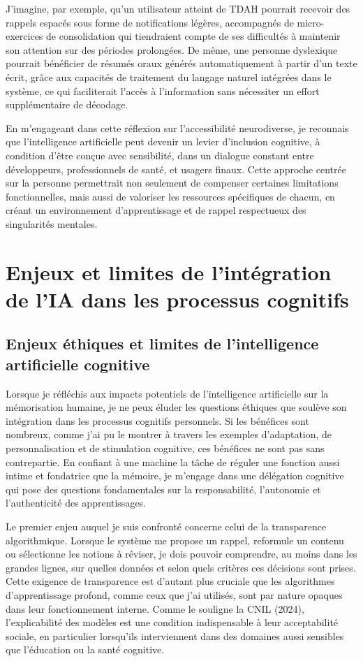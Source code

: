 \documentclass[11pt,a4paper]{report}
\begin{document}
J’imagine, par exemple, qu’un utilisateur atteint de TDAH pourrait recevoir des rappels espacés sous forme de notifications légères, accompagnés de micro-exercices de consolidation qui tiendraient compte de ses difficultés à maintenir son attention sur des périodes prolongées. De même, une personne dyslexique pourrait bénéficier de résumés oraux générés automatiquement à partir d’un texte écrit, grâce aux capacités de traitement du langage naturel intégrées dans le système, ce qui faciliterait l’accès à l’information sans nécessiter un effort supplémentaire de décodage.

En m’engageant dans cette réflexion sur l’accessibilité neurodiverse, je reconnais que l’intelligence artificielle peut devenir un levier d’inclusion cognitive, à condition d’être conçue avec sensibilité, dans un dialogue constant entre développeurs, professionnels de santé, et usagers finaux. Cette approche centrée sur la personne permettrait non seulement de compenser certaines limitations fonctionnelles, mais aussi de valoriser les ressources spécifiques de chacun, en créant un environnement d’apprentissage et de rappel respectueux des singularités mentales.

\section{Enjeux et limites de l’intégration de l’IA dans les processus cognitifs}

\subsection{Enjeux éthiques et limites de l’intelligence artificielle cognitive}

Lorsque je réfléchis aux impacts potentiels de l’intelligence artificielle sur la mémorisation humaine, je ne peux éluder les questions éthiques que soulève son intégration dans les processus cognitifs personnels. Si les bénéfices sont nombreux, comme j’ai pu le montrer à travers les exemples d’adaptation, de personnalisation et de stimulation cognitive, ces bénéfices ne sont pas sans contrepartie. En confiant à une machine la tâche de réguler une fonction aussi intime et fondatrice que la mémoire, je m’engage dans une délégation cognitive qui pose des questions fondamentales sur la responsabilité, l’autonomie et l’authenticité des apprentissages.

Le premier enjeu auquel je suis confronté concerne celui de la transparence algorithmique. Lorsque le système me propose un rappel, reformule un contenu ou sélectionne les notions à réviser, je dois pouvoir comprendre, au moins dans les grandes lignes, sur quelles données et selon quels critères ces décisions sont prises. Cette exigence de transparence est d’autant plus cruciale que les algorithmes d’apprentissage profond, comme ceux que j’ai utilisés, sont par nature opaques dans leur fonctionnement interne. Comme le souligne la CNIL (2024), l’explicabilité des modèles est une condition indispensable à leur acceptabilité sociale, en particulier lorsqu’ils interviennent dans des domaines aussi sensibles que l’éducation ou la santé cognitive.
\end{document}
